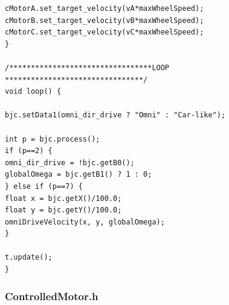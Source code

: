 \documentclass[12pt,english,twoside]{article}
\begin{document}
\begin{lstlisting}[style=CStyle]
cMotorA.set_target_velocity(vA*maxWheelSpeed);
cMotorB.set_target_velocity(vB*maxWheelSpeed);
cMotorC.set_target_velocity(vC*maxWheelSpeed);
}

/*********************************LOOP ********************************/
void loop() {

bjc.setData1(omni_dir_drive ? "Omni" : "Car-like");

int p = bjc.process();
if (p==2) { 
omni_dir_drive = !bjc.getB0();
globalOmega = bjc.getB1() ? 1 : 0;
} else if (p==7) { 
float x = bjc.getX()/100.0;
float y = bjc.getY()/100.0;
omniDriveVelocity(x, y, globalOmega);
}

t.update();
}
\end{lstlisting}
\newpage
\subsubsection*{ControlledMotor.h}
\end{document}
